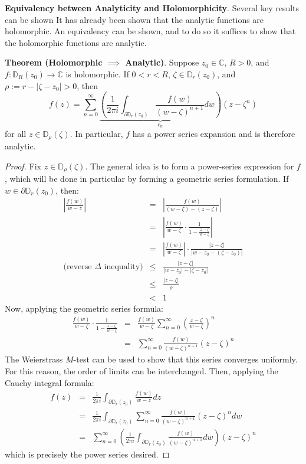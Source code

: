 \begin{framed}
\textbf{Equivalency between Analyticity and Holomorphicity}. Several key results can be shown It has already been shown that the analytic functions are holomorphic. An equivalency can be shown, and to do so it suffices to show that the holomorphic functions are analytic.

\textbf{Theorem (Holomorphic $\implies$ Analytic)}. Suppose $z_0\in\mathbb{C}$, $R>0$, and $f:\mathbb{D}_R(z_0)\to \mathbb{C}$ is holomorphic. If $0<r<R$, $\zeta\in\mathbb{D}_r(z_0)$, and $\rho :=r-|\zeta-z_0|>0$, then \[f(z)= \sum_{n=0}^\infty \underbrace{\left(\frac{1}{2\pi i} \int_{\partial \mathbb{D}_r(z_0)} \frac{f(w)}{(w-\zeta)^{n+1}} dw\right)}_{c_n} (z-\zeta^n)\] for all $z\in\mathbb{D}_\rho(\zeta)$. In particular, $f$ has a power series expansion and is therefore analytic.

\begin{proof}
    Fix $z\in \mathbb{D}_\rho(\zeta)$. The general idea is to form a power-series expression for $f$, which will be done in particular by forming a geometric series formulation. If $w\in \partial \mathbb{D}_r(z_0)$, then: \begin{eqnarray*}
        \left|\frac{f(w)}{w-z}\right| &=& \left|\frac{f(w)}{(w-\zeta)-(z-\zeta)}\right|\\
        &=& \left|\frac{f(w)}{w-\zeta} \cdot \frac{1}{1-\frac{z-\zeta}{w-\zeta}}\right|\\
        &=& \left|\frac{f(w)}{w-\zeta}\right|\cdot \frac{|z-\zeta|}{|w-z_0 - (\zeta - z_0)|}\\
        \text{(reverse $\Delta$ inequality)}&\leq & \frac{|z-\zeta|}{|w-z_0|-|\zeta-z_0|}\\
        &\leq& \frac{|z-\zeta|}{\rho}\\
        &<& 1
    \end{eqnarray*} Now, applying the geometric series formula: \begin{eqnarray*}
        \frac{f(w)}{w-\zeta} \cdot \frac{1}{1-\frac{z-\zeta}{w-\zeta}} &=& \frac{f(w)}{w-\zeta} \sum_{n=0}^\infty \left(\frac{z-\zeta}{w-\zeta}\right)^n\\
        &=& \sum_{n=0}^\infty \frac{f(w)}{(w-\zeta)^{n+1}} (z-\zeta)^n
    \end{eqnarray*} The Weierstrass $M$-test can be used to show that this series converges uniformly. For this reason, the order of limits can be interchanged. Then, applying the Cauchy integral formula: \begin{eqnarray*}
        f(z) &=& \frac{1}{2\pi i} \int_{\partial \mathbb{D}_r(z_0)} \frac{f(w)}{w-z} dz\\
        &=& \frac{1}{2\pi i} \int_{\partial \mathbb{D}_r(z_0)} \sum_{n=0}^\infty \frac{f(w)}{(w-\zeta)^{n+1}} (z-\zeta)^n dw\\
        &=& \sum_{n=0}^\infty \left(\frac{1}{2\pi i} \int_{\partial\mathbb{D}_r(z_0)} \frac{f(w)}{(w-\zeta)^{n+1}} dw\right) (z-\zeta)^n
    \end{eqnarray*} which is precisely the power series desired.
\end{proof}


\end{framed}
